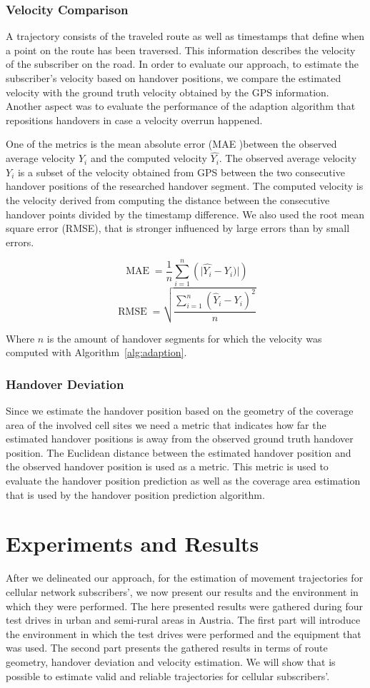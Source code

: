 \subsubsection{Velocity Comparison}
A trajectory consists of the traveled route as well as timestamps that define when a point on the route has been traversed. This information describes the velocity of the subscriber on the road. In order to evaluate our approach, to estimate the subscriber's velocity based on handover positions, we compare the estimated velocity with the ground truth velocity obtained by the GPS information. Another aspect was to evaluate the performance of the adaption algorithm that repositions handovers in case a velocity overrun happened.

One of the metrics is the mean absolute error (MAE )between the observed average velocity $ Y_i$  and the computed velocity $ \hat{Y_i}$. The observed average velocity $Y_i$ is a subset of the velocity obtained from GPS between the two consecutive handover positions of the researched handover segment. The computed velocity is the velocity derived from computing the distance between the consecutive handover points divided by the timestamp difference. We also used the root mean square error (RMSE), that is stronger influenced by large errors than by small errors.

\[\operatorname{MAE}  = \frac{1}{n}\sum_{i=1}^{n} \left(\lvert \hat{Y_i} - Y_i) \rvert \right)\]
\[\operatorname{RMSE}=\sqrt{\frac{\sum_{i=1}^n (\hat Y_i - Y_i)^2}{n}}\]

Where $n$ is the amount of handover segments for which the velocity was computed with Algorithm~\ref{alg:adaption}.
\subsubsection{Handover Deviation}
Since we estimate the handover position based on the geometry of the coverage area of the involved cell sites we need a metric that indicates how far the estimated handover positions is away from the observed ground truth handover position. The Euclidean distance between the estimated handover position and the observed handover position is used as a metric. This metric is used to evaluate the handover position prediction as well as the coverage area estimation that is used by the handover position prediction algorithm.

\section{Experiments and Results}
\label{sec:results}
After we delineated our approach, for the estimation of movement trajectories for cellular network subscribers', we now present our results and the environment in which they were performed. The here presented results were gathered during four test drives in urban and semi-rural areas in Austria. The first part will introduce the environment in which the test drives were performed and the equipment that was used. The second part presents the gathered results in terms of route geometry, handover deviation and velocity estimation. We will show that is possible to estimate valid and reliable trajectories for cellular subscribers'.

